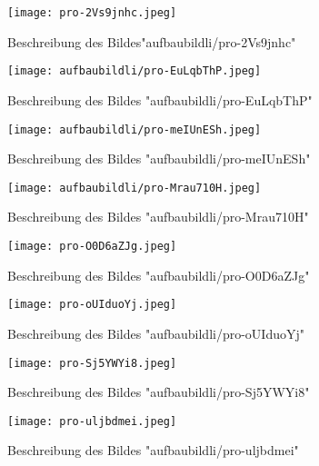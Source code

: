 \begin{figure}[h!]
	\centering
	\texttt{[image: pro-2Vs9jnhc.jpeg]}
	\caption{Beschreibung des Bildes"aufbaubildli/pro-2Vs9jnhc"}
	\label{fig:aufbaubildli2Vs9jnhc}
\end{figure}

\begin{figure}[h!]
	\centering
	\texttt{[image: aufbaubildli/pro-EuLqbThP.jpeg]}
	\caption{Beschreibung des Bildes "aufbaubildli/pro-EuLqbThP"}
	\label{fig:aufbaubildliEuLqbThP}
\end{figure}

\begin{figure}[h!]
	\centering
	\texttt{[image: aufbaubildli/pro-meIUnESh.jpeg]}
	\caption{Beschreibung des Bildes "aufbaubildli/pro-meIUnESh"}
	\label{fig:aufbaubildlimeIUnESh}
\end{figure}

\begin{figure}[h!]
	\centering
	\texttt{[image: aufbaubildli/pro-Mrau710H.jpeg]}
	\caption{Beschreibung des Bildes "aufbaubildli/pro-Mrau710H"}
	\label{fig:aufbaubildliMrau710H}
\end{figure}

\begin{figure}[h!]
	\centering
	\texttt{[image: pro-O0D6aZJg.jpeg]}
	\caption{Beschreibung des Bildes "aufbaubildli/pro-O0D6aZJg"}
	\label{fig:aufbaubildliO0D6aZJg}
\end{figure}

\begin{figure}[h!]
	\centering
	\texttt{[image: pro-oUIduoYj.jpeg]}
	\caption{Beschreibung des Bildes "aufbaubildli/pro-oUIduoYj"}
	\label{fig:aufbaubildlioUIduoYj}
\end{figure}

\begin{figure}[h!]
	\centering
	\texttt{[image: pro-Sj5YWYi8.jpeg]}
	\caption{Beschreibung des Bildes "aufbaubildli/pro-Sj5YWYi8"}
	\label{fig:aufbaubildliSj5YWYi8}
\end{figure}

\begin{figure}[h!]
	\centering
	\texttt{[image: pro-uljbdmei.jpeg]}
	\caption{Beschreibung des Bildes "aufbaubildli/pro-uljbdmei"}
	\label{fig:aufbaubildliuljbdmei}
\end{figure}


